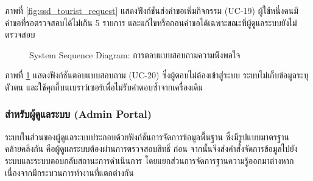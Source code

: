 ภาพที่ \ref{fig:ssd_tourist_request} แสดงฟังก์ชันส่งคำขอเพิ่มกิจกรรม (UC-19) ผู้ใช้หนึ่งคนมีคำขอที่รอตรวจสอบได้ไม่เกิน 5 รายการ และแก้ไขหรือถอนคำขอได้เฉพาะขณะที่ผู้ดูแลระบบยังไม่ตรวจสอบ

\begin{figure}[H]
\centering
{}
\caption{System Sequence Diagram: การตอบแบบสอบถามความพึงพอใจ}
\label{fig:ssd_tourist_survey}
\end{figure}

ภาพที่ \ref{fig:ssd_tourist_survey} แสดงฟังก์ชันตอบแบบสอบถาม (UC-20) ซึ่งผู้ตอบไม่ต้องเข้าสู่ระบบ ระบบไม่เก็บข้อมูลระบุตัวตน และใช้คุกกี้บนเบราว์เซอร์เพื่อไม่รับคำตอบซ้ำจากเครื่องเดิม

\subsubsection{สำหรับผู้ดูแลระบบ (Admin Portal)}

ระบบในส่วนของผู้ดูแลระบบประกอบด้วยฟังก์ชันการจัดการข้อมูลพื้นฐาน ซึ่งมีรูปแบบมาตรฐานคล้ายคลึงกัน คือผู้ดูแลระบบต้องผ่านการตรวจสอบสิทธิ์ ก่อน จากนั้นจึงส่งคำสั่งจัดการข้อมูลไปยังระบบและระบบตอบกลับสถานะการดำเนินการ โดยแยกส่วนการจัดการฐานความรู้ออกมาต่างหากเนื่องจากมีกระบวนการทำงานที่แตกต่างกัน

